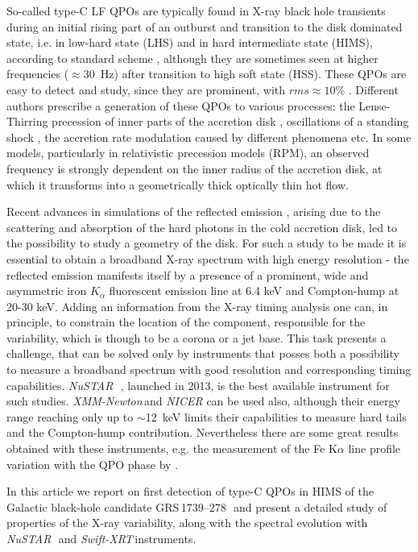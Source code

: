 \documentclass[a4paper,fleqn,usenatbib]{mnras}
\def\grs{{GRS\,1739--278\,}}
\def\swiftx{{\em Swift-XRT\,}}
\def\xmm{{\em XMM-Newton\,}}
\def\nustar{{\em NuSTAR\,}}
\begin{document}
So-called type-C LF QPOs are typically found in X-ray black hole transients during an initial rising part of an outburst and transition to the disk dominated state, i.e. in low-hard state (LHS) and in hard intermediate state (HIMS), according to standard scheme \citep{tanaka96,grebenev97, remillard06, belloni10}, although they are sometimes seen at higher frequencies ($\approx$30~Hz) after transition to high soft state (HSS). 
These QPOs are easy to detect and study, since they are prominent, with $rms\approx10\%$ \citep{casella05}. 
Different authors prescribe a generation of these QPOs to various processes: the Lense-Thirring precession of inner parts of the accretion disk \citep{stella98, ingram09}, oscillations of a standing shock \citep{molteni96}, the accretion rate modulation caused by different phenomena \citep{tagger99,cabanac10} etc. 
In some models, particularly in relativistic precession models (RPM), an observed frequency is strongly dependent on the inner radius of the accretion disk, at which it transforms into a geometrically thick optically thin hot flow. 

Recent advances in simulations of the reflected emission \citep{ross05,garcia14}, arising due to the scattering and absorption of the hard photons in the cold accretion disk, led to the possibility to study a geometry of the disk.  
For such a study to be made it is essential to obtain a broadband X-ray spectrum with high energy resolution - the reflected emission manifests itself by a presence of a prominent, wide and asymmetric iron $K_{\alpha}$ fluorescent emission line at 6.4 keV and Compton-hump at 20-30 keV. 
Adding an information from the X-ray timing analysis one can, in principle, to constrain the location of the component, responsible for the variability, which is though to be a corona or a jet base.
This task presents a challenge, that can be solved only by instruments that posses both a possibility to measure a broadband spectrum with good resolution and corresponding timing capabilities. 
\nustar\, \citep{harrison13_nust}, launched in 2013, is the best available instrument for such studies. 
\xmm and {\it NICER} can be used also, although their energy range reaching only up to $\sim$12~keV limits their capabilities to measure hard tails and the Compton-hump contribution.
Nevertheless there are some great results obtained with these instruments, e.g. the measurement of the Fe K$\alpha$ line profile variation with the QPO phase by \citet[][]{ingram16}. 

In this article we report on first detection of type-C QPOs in HIMS of the Galactic black-hole candidate \grs\, and present a detailed study of properties of the X-ray variability, along with the spectral evolution with \nustar\ and \swiftx instruments.
\end{document}
